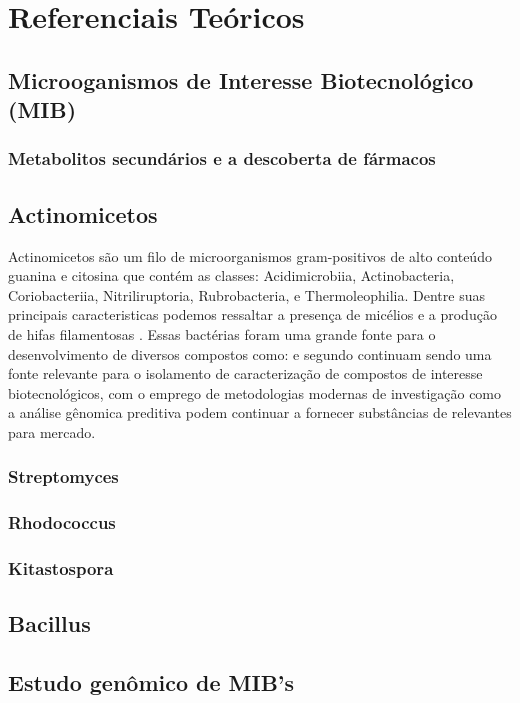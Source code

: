 \chapter{Referenciais Teóricos}
\label{cap:referenciais_teoricos}

\section{Microoganismos de Interesse Biotecnológico (MIB)}
\subsection{Metabolitos secundários e a descoberta de fármacos}

\section{Actinomicetos}
Actinomicetos são um filo de microorganismos gram-positivos de alto conteúdo
guanina e citosina que contém as classes: Acidimicrobiia, Actinobacteria, 
Coriobacteriia, Nitriliruptoria, Rubrobacteria, e Thermoleophilia\cite{yadav2018}.
Dentre suas principais caracteristicas podemos ressaltar a presença de micélios
e a produção de hifas filamentosas \cite{chater2016}.
Essas bactérias foram uma grande fonte para o desenvolvimento de diversos
compostos como:%
e segundo  continuam sendo uma fonte relevante
para o isolamento de caracterização de compostos de interesse biotecnológicos, com o
emprego de metodologias modernas de investigação como a análise gênomica preditiva
podem continuar a fornecer substâncias de relevantes para mercado.

\subsection{Streptomyces}%
\subsection{Rhodococcus}
\subsection{Kitastospora}
\section{Bacillus}

\section{Estudo genômico de MIB's}

